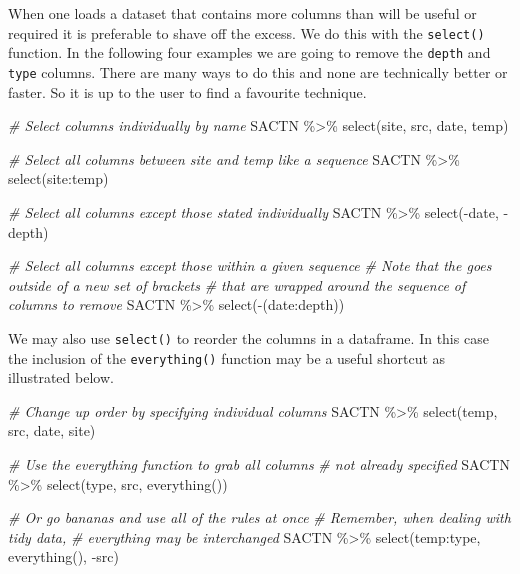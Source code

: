 \documentclass[
]{book}
\newenvironment{Shaded}{\begin{snugshade}}{\end{snugshade}}
\newcommand{\CommentTok}[1]{\textcolor[rgb]{0.56,0.35,0.01}{\textit{#1}}}
\newcommand{\FunctionTok}[1]{\textcolor[rgb]{0.00,0.00,0.00}{#1}}
\newcommand{\NormalTok}[1]{#1}
\newcommand{\SpecialCharTok}[1]{\textcolor[rgb]{0.00,0.00,0.00}{#1}}
\begin{document}
When one loads a dataset that contains more columns than will be useful or required it is preferable to shave off the excess. We do this with the \texttt{select()} function. In the following four examples we are going to remove the \texttt{depth} and \texttt{type} columns. There are many ways to do this and none are technically better or faster. So it is up to the user to find a favourite technique.

\begin{Shaded}
\begin{Highlighting}[]
\CommentTok{\# Select columns individually by name}
\NormalTok{SACTN }\SpecialCharTok{\%\textgreater{}\%} 
  \FunctionTok{select}\NormalTok{(site, src, date, temp)}

\CommentTok{\# Select all columns between site and temp like a sequence}
\NormalTok{SACTN }\SpecialCharTok{\%\textgreater{}\%} 
  \FunctionTok{select}\NormalTok{(site}\SpecialCharTok{:}\NormalTok{temp)}

\CommentTok{\# Select all columns except those stated individually}
\NormalTok{SACTN }\SpecialCharTok{\%\textgreater{}\%} 
  \FunctionTok{select}\NormalTok{(}\SpecialCharTok{{-}}\NormalTok{date, }\SpecialCharTok{{-}}\NormalTok{depth)}

\CommentTok{\# Select all columns except those within a given sequence}
  \CommentTok{\# Note that the \textquotesingle{}{-}\textquotesingle{} goes outside of a new set of brackets}
  \CommentTok{\# that are wrapped around the sequence of columns to remove}
\NormalTok{SACTN }\SpecialCharTok{\%\textgreater{}\%} 
  \FunctionTok{select}\NormalTok{(}\SpecialCharTok{{-}}\NormalTok{(date}\SpecialCharTok{:}\NormalTok{depth))}
\end{Highlighting}
\end{Shaded}

We may also use \texttt{select()} to reorder the columns in a dataframe. In this case the inclusion of the \texttt{everything()} function may be a useful shortcut as illustrated below.

\begin{Shaded}
\begin{Highlighting}[]
\CommentTok{\# Change up order by specifying individual columns}
\NormalTok{SACTN }\SpecialCharTok{\%\textgreater{}\%} 
  \FunctionTok{select}\NormalTok{(temp, src, date, site)}

\CommentTok{\# Use the everything function to grab all columns }
\CommentTok{\# not already specified}
\NormalTok{SACTN }\SpecialCharTok{\%\textgreater{}\%} 
  \FunctionTok{select}\NormalTok{(type, src, }\FunctionTok{everything}\NormalTok{())}

\CommentTok{\# Or go bananas and use all of the rules at once}
  \CommentTok{\# Remember, when dealing with tidy data,}
  \CommentTok{\# everything may be interchanged}
\NormalTok{SACTN }\SpecialCharTok{\%\textgreater{}\%} 
  \FunctionTok{select}\NormalTok{(temp}\SpecialCharTok{:}\NormalTok{type, }\FunctionTok{everything}\NormalTok{(), }\SpecialCharTok{{-}}\NormalTok{src)}
\end{Highlighting}
\end{Shaded}
\end{document}
